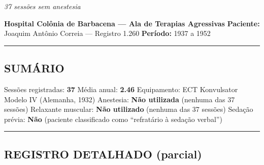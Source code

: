 
\noindent \textit{37 sessões sem anestesia}

\noindent \textbf{Hospital Colônia de Barbacena --- Ala de Terapias Agressivas}
\textbf{Paciente:} Joaquim Antônio Correia --- Registro 1.260
\textbf{Período:} 1937 a 1952

\vspace{0.5em}\noindent\rule{\textwidth}{0.5pt}\vspace{0.5em}

\subsection*{SUMÁRIO}

\noindent Sessões registradas: \textbf{37}
Média anual: \textbf{2.46}
Equipamento: ECT Konvulsator Modelo IV (Alemanha, 1932)
Anestesia: \textbf{Não utilizada} (nenhuma das 37 sessões)
Relaxante muscular: \textbf{Não utilizado} (nenhuma das 37 sessões)
Sedação prévia: \textbf{Não} (paciente classificado como \textquotedblleft{}refratário à sedação verbal\textquotedblright{})

\vspace{0.5em}\noindent\rule{\textwidth}{0.5pt}\vspace{0.5em}

\subsection*{REGISTRO DETALHADO (parcial)}

